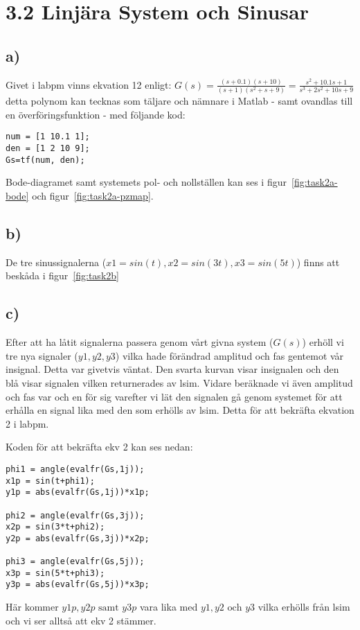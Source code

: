 \section*{3.2 Linjära System och Sinusar}
\subsection*{a)}
Givet i labpm vinns ekvation 12 enligt: 
$G(s) = \frac{(s+0.1)(s+10)}{(s+1)(s^2+s+9)} =
\frac{s^2+10.1s+1}{s^3+2s^2+10s+9}$
detta polynom kan tecknas som täljare och nämnare i Matlab - samt ovandlas till
en överföringsfunktion - med följande kod:

\begin{lstlisting}
num = [1 10.1 1];
den = [1 2 10 9];
Gs=tf(num, den);
\end{lstlisting}

Bode-diagramet samt systemets pol- och nollställen kan ses i
figur~\ref{fig:task2a-bode} och figur~\ref{fig:task2a-pzmap}.

\subsection*{b)}
De tre sinussignalerna ($x1 = sin(t), x2 = sin(3t), x3 = sin(5t)$) finns att
beskåda i figur~\ref{fig:task2b}

\subsection*{c)}
Efter att ha låtit signalerna passera genom vårt givna system ($G(s)$) erhöll
vi tre nya signaler ($y1, y2, y3$) vilka hade förändrad amplitud och fas
gentemot vår insignal. Detta var givetvis väntat. Den svarta kurvan visar
insignalen och den blå visar signalen vilken returnerades av lsim. Vidare
beräknade vi även amplitud och fas var och en för sig varefter vi lät den
signalen gå genom systemet för att erhålla en signal lika med den som erhölls
av lsim. Detta för att bekräfta ekvation 2 i labpm.

Koden för att bekräfta ekv 2 kan ses nedan:

\begin{lstlisting}
phi1 = angle(evalfr(Gs,1j));
x1p = sin(t+phi1);
y1p = abs(evalfr(Gs,1j))*x1p;

phi2 = angle(evalfr(Gs,3j));
x2p = sin(3*t+phi2);
y2p = abs(evalfr(Gs,3j))*x2p;

phi3 = angle(evalfr(Gs,5j));
x3p = sin(5*t+phi3);
y3p = abs(evalfr(Gs,5j))*x3p;
\end{lstlisting}

Här kommer $y1p, y2p \text{ samt } y3p$ vara lika med $y1, y2 \text{ och } y3$
vilka erhölls från lsim och vi ser alltså att ekv 2 stämmer.
